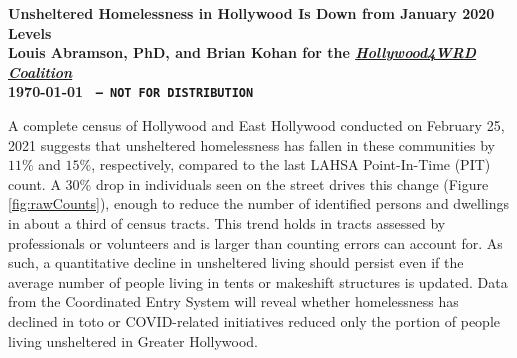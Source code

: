 \documentclass[11pt]{article}
\def\bfr{\bf\color{red}}
\def\resp{respectively}
\begin{document}

\begin{center}
	\Large\bf Unsheltered Homelessness in Hollywood Is Down from January 2020 Levels\\
	\vspace{1ex}
	{\normalsize\rm Louis Abramson, PhD, and Brian Kohan 
	for the \href{http://www.hollywood4wrd.live}{\it Hollywood4WRD Coalition} \\ \today 
	{\bfr \texttt{ -- NOT FOR DISTRIBUTION}}}
\end{center}

 A complete census of Hollywood and East Hollywood conducted on February 25, 2021 
suggests that unsheltered homelessness has fallen in these communities by $11\%$ and $15\%$, \resp, compared to 
the last LAHSA Point-In-Time (PIT) count. A 30\% drop in individuals seen on the street drives this 
change (Figure \ref{fig:rawCounts}), enough to reduce the number of identified persons and dwellings in 
about a third of census tracts. This trend holds in tracts assessed by professionals or volunteers and is larger 
than counting errors can account for. As such, a quantitative decline in unsheltered living should persist 
even if the average number of people living in tents or makeshift structures is updated. Data from the Coordinated 
Entry System will reveal whether homelessness has declined in toto or COVID-related initiatives reduced only 
the portion of people living unsheltered in Greater Hollywood.
\end{document}
